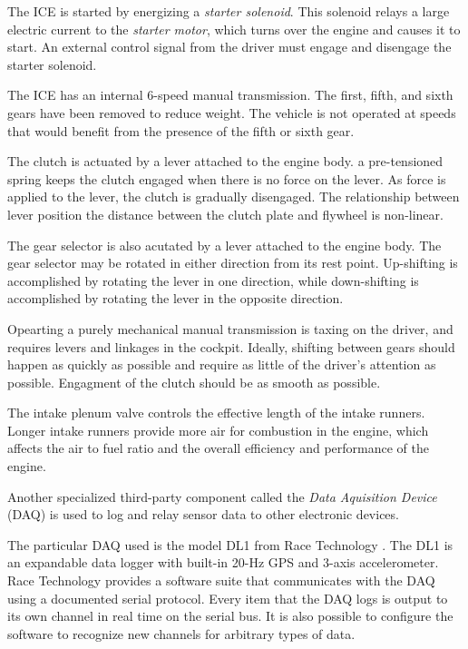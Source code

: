 The ICE is started by energizing a \emph{starter solenoid}. This solenoid relays a large electric 
current to the \emph{starter motor}, which turns over the engine and causes it to start. An 
external control signal from the driver must engage and disengage the starter solenoid.

The ICE has an internal 6-speed manual transmission. The first, fifth, and sixth gears have been 
removed to reduce weight. The vehicle is not operated at speeds that would benefit from the presence 
of the fifth or sixth gear.

The clutch is actuated by a lever attached to the engine body. a pre-tensioned spring keeps the 
clutch engaged when there is no force on the lever. As force is applied to the lever, the clutch 
is gradually disengaged. The relationship between lever position the distance between the clutch 
plate and flywheel is non-linear. 

The gear selector is also acutated by a lever attached to the engine body. The gear selector may 
be rotated in either direction from its rest point. Up-shifting is accomplished by rotating the 
lever in one direction, while down-shifting is accomplished by rotating the lever in the opposite 
direction. 

Opearting a purely mechanical manual transmission is taxing on the driver, and requires
levers and linkages in the cockpit. Ideally, shifting between gears should happen as quickly 
as possible and require as little of the driver's attention as possible. Engagment of the clutch
should be as smooth as possible. 

The intake plenum valve controls the effective length of the intake runners. Longer intake runners
provide more air for combustion in the engine, which affects the air to fuel ratio and the
overall efficiency and performance of the engine.

Another specialized third-party component called the \emph{Data Aquisition Device} (DAQ) is used
to log and relay sensor data to other electronic devices.

The particular DAQ used is the model DL1 from Race Technology \cite{DL1Dsheet}. The DL1 is an 
expandable data logger with built-in 20-Hz GPS and 3-axis accelerometer. Race Technology provides 
a software suite that communicates with the DAQ using a documented serial protocol. Every item that 
the DAQ logs is output to its own channel in real time on the serial bus. It is also possible to 
configure the software to recognize new channels for arbitrary types of data. 

